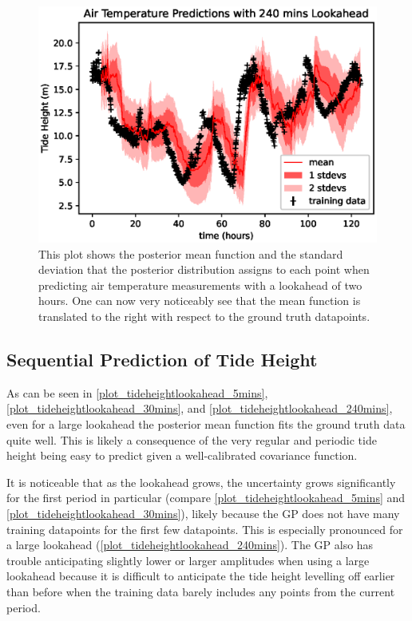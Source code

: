 \documentclass{article}
\begin{document}
                \begin{figure}[ht!]
                    \includegraphics[width=\linewidth,height=\textheight,keepaspectratio]{air_temp_lookahead_240mins.eps}
                    \caption{This plot shows the posterior mean function and the standard deviation that the posterior distribution assigns to each point when predicting air temperature measurements with a lookahead of two hours. One can now very noticeably see that the mean function is translated to the right with respect to the ground truth datapoints.}
                    \label{plot_airtemplookahead_240mins}
                \end{figure}
            
            \FloatBarrier
            \subsection{Sequential Prediction of Tide Height}

                As can be seen in \cref{plot_tideheightlookahead_5mins}, \cref{plot_tideheightlookahead_30mins}, and \cref{plot_tideheightlookahead_240mins}, even for a large lookahead the posterior mean function fits the ground truth data quite well. This is likely a consequence of the very regular and periodic tide height being easy to predict given a well-calibrated covariance function.

                It is noticeable that as the lookahead grows, the uncertainty grows significantly for the first period in particular (compare \cref{plot_tideheightlookahead_5mins} and \cref{plot_tideheightlookahead_30mins}), likely because the GP does not have many training datapoints for the first few datapoints. This is especially pronounced for a large lookahead (\cref{plot_tideheightlookahead_240mins}).
                The GP also has trouble anticipating slightly lower or larger amplitudes when using a large lookahead because it is difficult to anticipate the tide height levelling off earlier than before when the training data barely includes any points from the current period.
\end{document}
